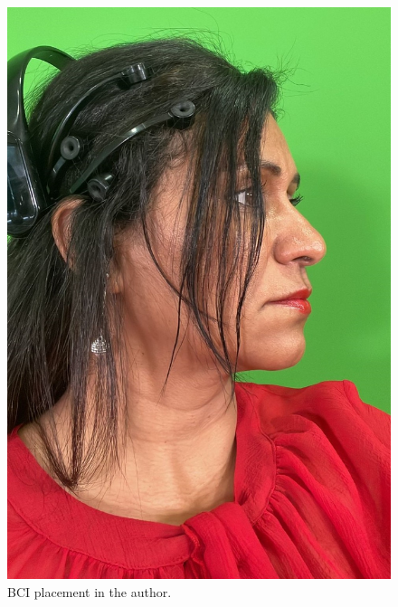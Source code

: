 \documentclass[english]{textolivre}
\begin{document}
\begin{figure}[h!]
\begin{minipage}{0.45\textwidth}
 \includegraphics[width=\textwidth]{fig3.png}
 \caption{BCI placement in the author.}
 \label{fig03}
 \end{minipage}%
\end{figure}
\end{document}
